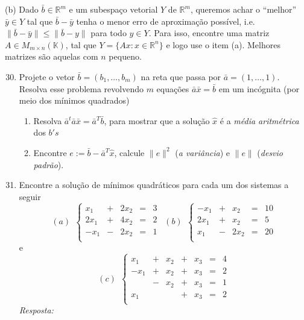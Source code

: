 \documentclass[10pt]{article}
\theoremstyle{plain}
\theoremstyle{obs}
\numberwithin{equation}{section}
\begin{document}
 (b) Dado $\bar{b} \in \mathbb{R}^{m}$ e um subespaço vetorial $Y$ de $\mathbb{R}^{m}$, 
queremos achar o ``melhor'' $\bar{y} \in Y$
tal que $\bar{b}-\bar{y}$ tenha o menor erro de aproximação possível, i.e. 
$\|\bar{b}-\bar{y}\|\leq \|\bar{b}-y\|$ para todo $y \in Y$. Para isso, encontre 
uma matriz $A \in M_{m\times n}(\mathbb{K})$, 
tal que $Y=\{A x: x \in \mathbb{R}^{n}\}$ e logo use o item (a).
Melhores matrizes são aquelas com $n$ pequeno.
 \begin{enumerate}
 \setcounter{enumi}{29}
 \item Projete o vetor $\bar{b}=(b_1, \dots, b_m)$ na reta que passa por 
 $\bar{a}=(1,\dots,1)$. Resolva esse problema revolvendo 
 $m$ equações $\bar{a}\bar{x}=\bar{b}$ em um incógnita (por meio 
 dos mínimos quadrados)
    \begin{enumerate}
     \item Resolva $\bar{a}^{t}\bar{a}\bar{x}=\bar{a}^{T}\bar{b}$, para mostrar
     que a solução $\hat{x}$ é a {\it média aritmétrica} dos $b's$ 
     \item Encontre $e:=\bar{b}-\bar{a}^{T}\hat{x}$,
     calcule $\|e\|^{2}$ ({\it a variância}) e $\|e\|$ ({\it desvio padrão}).
    \end{enumerate}

 \item 
 Encontre a solução de mínimos quadráticos
 para cada um dos sistemas a seguir
 $$
(a) \ \ 
\left \{
\begin{matrix}
x_1 &+&2x_2 &=& 3 \\%
2x_1 &+& 4x_2&=&2  \\
-x_1 &-& 2x_2 &=&1 \\
\end{matrix}
\right. \ \ 
(b) \ \ 
\left \{
\begin{matrix}
-x_1 &+&x_2 &=& 10 \\%
2x_1 &+& x_2&=&5  \\
x_1 &-& 2x_2 &=&20 \\
\end{matrix} \right.
$$
e 
$$
(c) \ \ 
\left \{
\begin{matrix}
x_1  &+& x_2 &+&x_3&=& 4 \\%
-x_1 &+& x_2 &+&x_3&=& 2 \\
     &-& x_2 &+&x_3&=& 1 \\%
 x_1 & &     &+&x_3&=& 2 \\
\end{matrix}\right.
$$ 
 {\it Resposta: } 
 

\end{enumerate}
\end{document}
